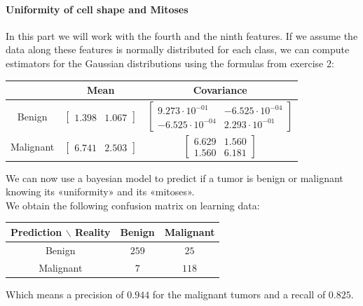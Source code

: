 \documentclass[a4paper, 10pt]{article}
\begin{document}
\paragraph{Uniformity of cell shape and Mitoses}
In this part we will work with the fourth and the ninth features.
If we assume the data along these features is normally distributed for each class, we can compute
estimators for the Gaussian distributions using the formulas from exercise 2:
\begin{center}
    \begin{tabular}{ |c|c|c| }
        \hline
        \ & Mean & Covariance \\
        \hline
        Benign & $\begin{bmatrix}
            1.398 & 1.067
        \end{bmatrix}$ & $\begin{bmatrix}
            9.273\cdot10^{-01} & -6.525\cdot10^{-04}\\
            -6.525\cdot10^{-04} & 2.293\cdot10^{-01}
        \end{bmatrix}$ \\
        \hline
        Malignant & $\begin{bmatrix}
            6.741 & 2.503
        \end{bmatrix}$ & $\begin{bmatrix}
            6.629 & 1.560\\
            1.560 & 6.181
        \end{bmatrix}$ \\ 
        \hline
    \end{tabular}
\end{center}
We can now use a bayesian model to predict if a tumor is benign or malignant knowing its «uniformity» and its «mitoses».
\\
We obtain the following confusion matrix on learning data:
\begin{center}
    \begin{tabular}{ |c|c|c| }
        \hline
        Prediction $\backslash$ Reality & Benign & Malignant \\
        \hline
        Benign & $259$ & $25$ \\
        \hline
        Malignant & $7$ & $118$ \\ 
        \hline
    \end{tabular}
\end{center}
Which means a precision of $0.944$ for the malignant tumors and a recall of $0.825$.
\\
\end{document}
